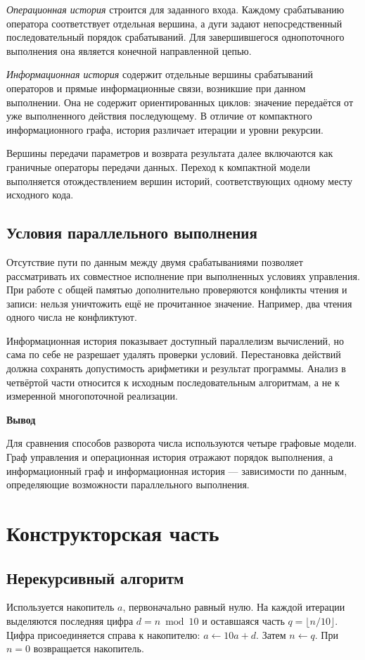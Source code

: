 \documentclass[14pt,a4paper]{extarticle}
\newcommand{\conclusion}[1]{\par\medskip\noindent\begin{minipage}{\linewidth}\setlength{\parindent}{1.25cm}\noindent\hspace*{\parindent}\textbf{Вывод}\par\indent #1\par\end{minipage}\par}
\numberwithin{equation}{section}
\numberwithin{figure}{section}
\numberwithin{table}{section}
\begin{document}
\textit{Операционная история} строится для заданного входа. Каждому срабатыванию оператора соответствует отдельная вершина, а дуги задают непосредственный последовательный порядок срабатываний. Для завершившегося однопоточного выполнения она является конечной направленной цепью.

\textit{Информационная история} содержит отдельные вершины срабатываний операторов и прямые информационные связи, возникшие при данном выполнении. Она не содержит ориентированных циклов: значение передаётся от уже выполненного действия последующему. В отличие от компактного информационного графа, история различает итерации и уровни рекурсии.

Вершины передачи параметров и возврата результата далее включаются как граничные операторы передачи данных. Переход к компактной модели выполняется отождествлением вершин историй, соответствующих одному месту исходного кода.

\subsection{Условия параллельного выполнения}
Отсутствие пути по данным между двумя срабатываниями позволяет рассматривать их совместное исполнение при выполненных условиях управления. При работе с общей памятью дополнительно проверяются конфликты чтения и записи: нельзя уничтожить ещё не прочитанное значение. Например, два чтения одного числа не конфликтуют.

Информационная история показывает доступный параллелизм вычислений, но сама по себе не разрешает удалять проверки условий. Перестановка действий должна сохранять допустимость арифметики и результат программы. Анализ в четвёртой части относится к исходным последовательным алгоритмам, а не к измеренной многопоточной реализации.
\conclusion{Для сравнения способов разворота числа используются четыре графовые модели. Граф управления и операционная история отражают порядок выполнения, а информационный граф и информационная история --- зависимости по данным, определяющие возможности параллельного выполнения.}

\clearpage\section{Конструкторская часть}
\subsection{Нерекурсивный алгоритм}
Используется накопитель $a$, первоначально равный нулю. На каждой итерации выделяются последняя цифра $d=n\bmod10$ и оставшаяся часть $q=\lfloor n/10\rfloor$. Цифра присоединяется справа к накопителю: $a\gets10a+d$. Затем $n\gets q$. При $n=0$ возвращается накопитель.
\end{document}

